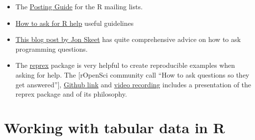\documentclass[
]{book}
\providecommand{\tightlist}{%
  \setlength{\itemsep}{0pt}\setlength{\parskip}{0pt}}
\begin{document}
\begin{itemize}
\tightlist
\item
  The \href{http://www.r-project.org/posting-guide.html}{Posting Guide} for the R
  mailing lists.
\item
  \href{http://blog.revolutionanalytics.com/2014/01/how-to-ask-for-r-help.html}{How to ask for R help}
  useful guidelines
\item
  \href{http://codeblog.jonskeet.uk/2010/08/29/writing-the-perfect-question/}{This blog post by Jon Skeet}
  has quite comprehensive advice on how to ask programming questions.
\item
  The \href{https://cran.rstudio.com/web/packages/reprex/}{reprex} package is very helpful to create reproducible examples when asking for help. The {[}rOpenSci community call ``How to ask questions so they get answered''{]}, \href{https://github.com/ropensci/commcalls/issues/14}{Github link} and \href{https://vimeo.com/208749032}{video recording} includes a presentation of the reprex package and of its philosophy.
\end{itemize}

\hypertarget{data}{%
\chapter{Working with tabular data in R}\label{data}}
\end{document}
